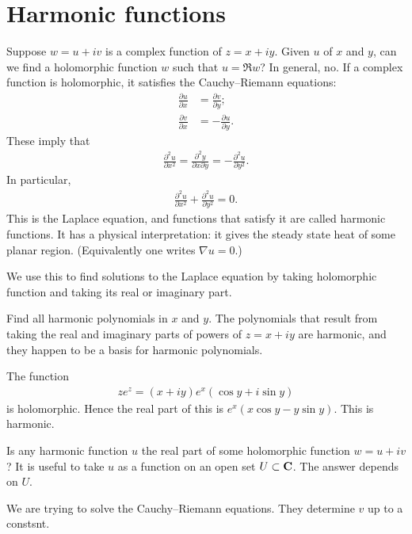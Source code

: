 \documentclass[11pt, oneside,margin=1in]{article}
\begin{document}
\section{Harmonic functions}
Suppose $w=u+iv$ is a complex function of $ z=x+iy$. Given $u$ of $x$ and $y$, can we find a holomorphic function $w$ such that $u = \Re w$? In general, no. If a complex function is holomorphic, it satisfies the Cauchy--Riemann equations:
\begin{align*}
	\frac{\partial u}{\partial x} &= \frac{\partial v}{\partial y};\\\frac{\partial v}{\partial x}& = - \frac{\partial u}{\partial y}.
\end{align*}
These imply that
\begin{align*}
	\frac{\partial^2 u}{\partial x^2} = \frac{\partial^2y}{\partial x \partial y} = -\frac{\partial^2 u}{\partial y^2}.
\end{align*}
In particular,
\begin{align*}
\frac{\partial ^2 u}{\partial x^2} + \frac{\partial^2 u}{\partial y^2} = 0.
\end{align*}
This is the Laplace equation, and functions that satisfy it are called harmonic functions. It has a physical interpretation: it gives the steady state heat of some planar region. (Equivalently one writes $\nabla u=0$.) 

We use this to find solutions to the Laplace equation by taking holomorphic function and taking its real or imaginary part.
\begin{example}[ ]\label{}\text{}
Find all harmonic polynomials in $x$ and $y$. The polynomials that result from taking the real and imaginary parts of powers of $z = x+iy$ are harmonic, and they happen to be a basis for harmonic polynomials.
\end{example}

\begin{example}[ ]\label{}\text{}
The function
\begin{align*}
	ze^z = (x+iy)e^x (\cos y + i\sin y)
\end{align*}
is holomorphic. Hence the real part of this is $e^x(x\cos y - y\sin y)$. This is harmonic.
\end{example}

Is any harmonic function $u$ the real part of some holomorphic function $w = u+iv$? It is useful to take $u$ as a function on an open set $U\subset \mathbf C$. The answer depends on $U$. 

We are trying to solve the Cauchy--Riemann equations. They determine $v$ up to a constsnt. 
\end{document}
